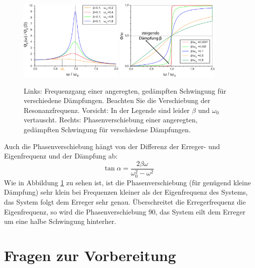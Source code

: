 \begin{figure}[ht!]
	\centering
	\includegraphics[width=0.45\textwidth]{Versuch_neu_1-2/figures/3946.pdf}
	\includegraphics[width=0.45\textwidth]{Versuch_neu_1-2/figures/3947.pdf}
	\caption{Links: Frequenzgang einer angeregten, gedämpften Schwingung für verschiedene Dämpfungen. Beachten Sie die Verschiebung der Resonanzfrequenz. Vorsicht: In der Legende sind leider $\beta$ und $\omega_0$ vertauscht. Rechts: Phasenverschiebung einer angeregten, gedämpften Schwingung für verschiedene Dämpfungen.}
	\label{fig:Resonanz}
\end{figure}

Auch die Phasenverschiebung hängt von der Differenz der Erreger- und Eigenfrequenz und der Dämpfung ab:
\begin{equation*}
	\tan\alpha = \frac{2\beta\omega}{\omega_0^2-\omega^2}
\end{equation*}
Wie in Abbildung \ref{fig:Resonanz} zu sehen ist, ist die Phasenverschiebung (für genügend kleine Dämpfung) sehr klein bei Frequenzen kleiner als der Eigenfrequenz des Systems, das System folgt dem Erreger sehr genau. Überschreitet die Erregerfrequenz die Eigenfrequenz, so wird die Phasenverschiebung 90\degree, das System eilt dem Erreger um eine halbe Schwingung hinterher.
\section{Fragen zur Vorbereitung}

